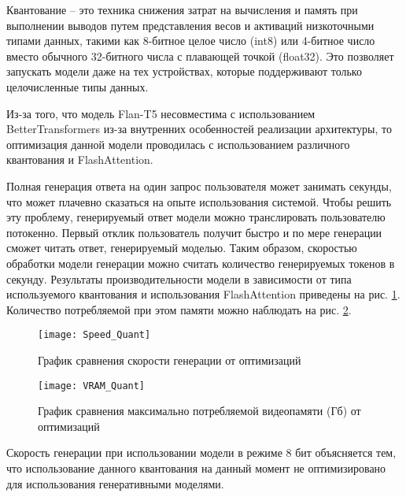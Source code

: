 Квантование -- это техника снижения затрат на вычисления и память при выполнении выводов путем представления весов и активаций низкоточными типами данных, такими как 8-битное целое число (int8) или 4-битное число вместо обычного 32-битного числа с плавающей точкой (float32). Это позволяет запускать модели даже на тех устройствах, которые поддерживают только целочисленные типы данных.

Из-за того, что модель Flan-T5 несовместима с использованием BetterTransformers из-за внутренних особенностей реализации архитектуры, то оптимизация данной модели проводилась с использованием различного квантования и FlashAttention.

Полная генерация ответа на один запрос пользователя может занимать секунды, что может плачевно сказаться на опыте использования системой. Чтобы решить эту проблему, генерируемый ответ модели можно транслировать пользователю потокенно. Первый отклик пользователь получит быстро и по мере генерации сможет читать ответ, генерируемый моделью. Таким образом, скоростью обработки модели генерации можно считать количество генерируемых токенов в секунду. Результаты производительности модели в зависимости от типа используемого квантования и использования FlashAttention приведены на рис. \ref{speed-quant}. Количество потребляемой при этом памяти можно наблюдать на рис. \ref{vram-quant}.

\begin{figure}[H]
    \centering
    \texttt{[image: Speed\_Quant]}
    \caption{График сравнения скорости генерации от оптимизаций}
    \label{speed-quant}
\end{figure}

\begin{figure}[H]
    \centering
    \texttt{[image: VRAM\_Quant]}
    \caption{График сравнения максимально потребляемой видеопамяти (Гб) от оптимизаций}
    \label{vram-quant}
\end{figure}

Скорость генерации при использовании модели в режиме 8 бит объясняется тем, что использование данного квантования на данный момент не оптимизировано для использования генеративными моделями.